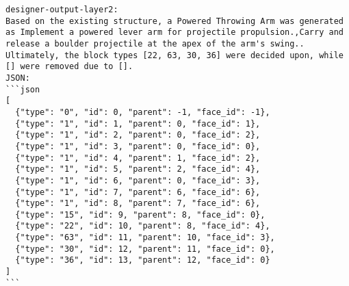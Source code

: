\begin{lstlisting}
designer-output-layer2:
Based on the existing structure, a Powered Throwing Arm was generated as Implement a powered lever arm for projectile propulsion.,Carry and release a boulder projectile at the apex of the arm's swing.. 
Ultimately, the block types [22, 63, 30, 36] were decided upon, while [] were removed due to [].
JSON:
```json
[
  {"type": "0", "id": 0, "parent": -1, "face_id": -1},
  {"type": "1", "id": 1, "parent": 0, "face_id": 1},
  {"type": "1", "id": 2, "parent": 0, "face_id": 2},
  {"type": "1", "id": 3, "parent": 0, "face_id": 0},
  {"type": "1", "id": 4, "parent": 1, "face_id": 2},
  {"type": "1", "id": 5, "parent": 2, "face_id": 4},
  {"type": "1", "id": 6, "parent": 0, "face_id": 3},
  {"type": "1", "id": 7, "parent": 6, "face_id": 6},
  {"type": "1", "id": 8, "parent": 7, "face_id": 6},
  {"type": "15", "id": 9, "parent": 8, "face_id": 0},
  {"type": "22", "id": 10, "parent": 8, "face_id": 4},
  {"type": "63", "id": 11, "parent": 10, "face_id": 3},
  {"type": "30", "id": 12, "parent": 11, "face_id": 0},
  {"type": "36", "id": 13, "parent": 12, "face_id": 0}
]
```
\end{lstlisting}

